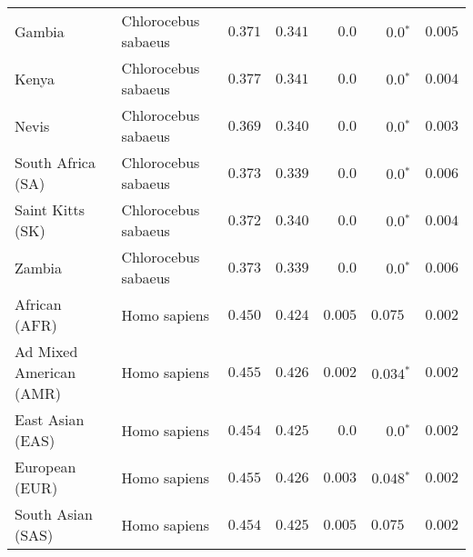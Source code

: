 \begin{center}
\begin{adjustbox}{width = 1\textwidth}
\begin{tabular}{|l|l|r|r|r|r|r|}
            Gambia                          & Chlorocebus sabaeus & $ 0.371$ & $ 0.341$ & $0.0$    & $\bm{0.0{^*}}$    & $ 0.005$ \\
            Kenya              & Chlorocebus sabaeus & $ 0.377$ & $ 0.341$ & $0.0$    & $\bm{0.0{^*}}$    & $ 0.004$ \\
            Nevis               & Chlorocebus sabaeus & $ 0.369$ & $ 0.340$ & $0.0$    & $\bm{0.0{^*}}$    & $ 0.003$ \\
            South Africa (SA)                         & Chlorocebus sabaeus & $ 0.373$ & $ 0.339$ & $0.0$    & $\bm{0.0{^*}}$    & $ 0.006$ \\
            Saint Kitts (SK)                  & Chlorocebus sabaeus        & $ 0.372$ & $ 0.340$ & $0.0$ & $\bm{0.0{^*}}$        & $ 0.004$ \\
            Zambia        & Chlorocebus sabaeus        & $ 0.373$ & $ 0.339$ & $0.0$ & $\bm{0.0{^*}}$ & $ 0.006$ \\
            African (AFR)               & Homo sapiens        & $ 0.450$ & $ 0.424$ & $ 0.005$    & $ 0.075~~$    & $ 0.002$ \\
            Ad Mixed American (AMR)                 & Homo sapiens        & $ 0.455$ & $ 0.426$ & $ 0.002$ & $\bm{ 0.034{^*}}$ & $ 0.002$ \\
            East Asian (EAS)              & Homo sapiens        & $ 0.454$ & $ 0.425$ & $0.0$ & $\bm{0.0{^*}}$        & $ 0.002$ \\
            European (EUR)              & Homo sapiens        & $ 0.455$ & $ 0.426$ & $ 0.003$ & $\bm{ 0.048{^*}}$        & $ 0.002$ \\
            South Asian (SAS)              & Homo sapiens        & $ 0.454$ & $ 0.425$ & $ 0.005$ & $ 0.075~~$        & $ 0.002$ \\
            \bottomrule
        \end{tabular}
    \end{adjustbox}
\end{center}